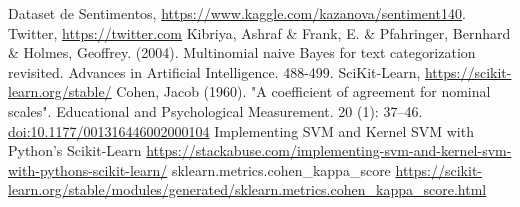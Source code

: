\documentclass[conference]{IEEEtran}
\begin{document}
\begin{thebibliography}{00}
 Dataset de Sentimentos, \url{https://www.kaggle.com/kazanova/sentiment140}.
 Twitter, \url{https://twitter.com}
 Kibriya, Ashraf \& Frank, E. \& Pfahringer, Bernhard \& Holmes, Geoffrey. (2004). Multinomial naive Bayes for text categorization revisited. Advances in Artificial Intelligence. 488-499. \label{kibriya}
 SciKit-Learn, \url{https://scikit-learn.org/stable/}
 Cohen, Jacob (1960). "A coefficient of agreement for nominal scales". Educational and Psychological Measurement. 20 (1): 37–46. \url{doi:10.1177/001316446002000104}
 Implementing SVM and Kernel SVM with Python's Scikit-Learn \url{https://stackabuse.com/implementing-svm-and-kernel-svm-with-pythons-scikit-learn/}
 sklearn.metrics.cohen\_kappa\_score \url{https://scikit-learn.org/stable/modules/generated/sklearn.metrics.cohen_kappa_score.html}

\end{thebibliography}
\end{document}
